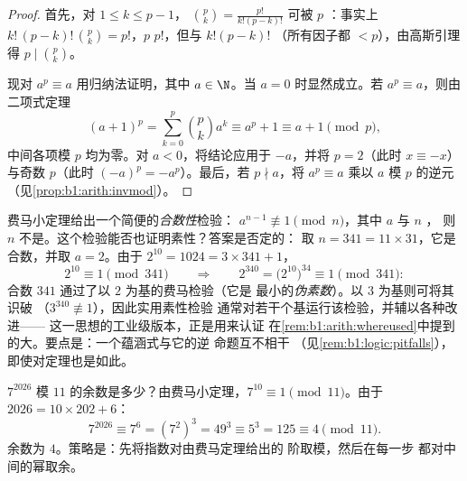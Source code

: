 \begin{proof}
首先，对 $1 \leq k \leq p - 1$， $\binom pk
= \frac{p!}{k!(p-k)!}$ 可被 $p$ ：事实上 $k!\,(p-k)!\,
\binom pk = p!$，$p$  $p!$，但与 $k!(p-k)!$ 
（所有因子都 $< p$），由高斯引理得 $p \mid \binom pk$。

现对 $a^p \equiv a$ 用归纳法证明，其中 $a \in \N$。当 $a =
0$ 时显然成立。若 $a^p \equiv a$，则由二项式定理
\[
(a+1)^p = \sum_{k=0}^{p} \binom pk a^k
\equiv a^p + 1 \equiv a + 1 \pmod p,
\]
中间各项模 $p$ 均为零。对 $a < 0$，将结论应用于
$-a$，并将 $p = 2$（此时 $x \equiv -x$）与奇数 $p$（此时
$(-a)^p = -a^p$）。最后，若 $p \nmid a$，将 $a^p \equiv a$ 乘以
$a$ 模 $p$ 的逆元（见\cref{prop:b1:arith:invmod}）。
\end{proof}

\begin{example}[费马小定理的逆不成立：$341$]\label{ex:b1:arith:pseudoprime}
费马小定理给出一个简便的\emph{合数性}检验：
$a^{n-1} \not\equiv 1 \pmod n$，其中 $a$ 与 $n$ ，
则 $n$ 不是。这个检验能否也证明素性？答案是否定的：
取 $n = 341 = 11 \times 31$，它是合数，并取 $a = 2$。由于
$2^{10} = 1024 = 3 \times 341 + 1$，
\[
2^{10} \equiv 1 \pmod{341}
\qquad\Longrightarrow\qquad
2^{340} = \bigl(2^{10}\bigr)^{34} \equiv 1 \pmod{341} :
\]
合数 $341$ 通过了以 $2$ 为基的费马检验（它是
最小的\emph{伪素数}）。以 $3$ 为基则可将其识破
（$3^{340} \not\equiv 1$），因此实用素性检验
通常对若干个基运行该检验，并辅以各种改进——
这一思想的工业级版本，正是用来认证
在\cref{rem:b1:arith:whereused}中提到的大。要点是：一个蕴涵式与它的逆
命题互不相干
（见\cref{rem:b1:logic:pitfalls}），即使对定理也是如此。
\end{example}

\begin{example}[同余计算的实例]\label{ex:b1:arith:congruences}
$7^{2026}$ 模 $11$ 的余数是多少？由费马小定理，$7^{10}
\equiv 1 \pmod{11}$。由于 $2026 = 10 \times 202 + 6$：
\[
7^{2026} \equiv 7^6 = (7^2)^3 = 49^3 \equiv 5^3 = 125 \equiv 4
\pmod{11}.
\]
余数为 $4$。策略是：先将指数对由费马定理给出的
阶取模，然后在每一步
都对中间的幂取余。
\end{example}

